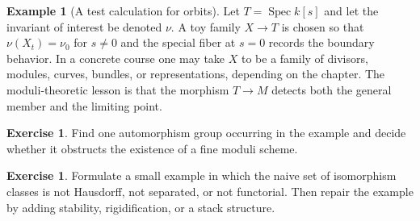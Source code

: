 \documentclass[11pt]{amsart}
\theoremstyle{definition}
\newtheorem{example}[theorem]{Example}
\newtheorem{exercise}[theorem]{Exercise}
\newcommand{\Spec}{\operatorname{Spec}}
\begin{document}
\begin{example}[A test calculation for orbits]
Let $T=\Spec k[s]$ and let the invariant of interest be denoted $\nu$.  A toy family $X\to T$ is chosen so that $\nu(X_t)=\nu_0$ for $s\ne0$ and the special fiber at $s=0$ records the boundary behavior.  In a concrete course one may take $X$ to be a family of divisors, modules, curves, bundles, or representations, depending on the chapter.  The moduli-theoretic lesson is that the morphism $T\to M$ detects both the general member and the limiting point.
\end{example}
\begin{exercise}
Find one automorphism group occurring in the example and decide whether it obstructs the existence of a fine moduli scheme.
\end{exercise}
\begin{exercise}
Formulate a small example in which the naive set of isomorphism classes is not Hausdorff, not separated, or not functorial.  Then repair the example by adding stability, rigidification, or a stack structure.
\end{exercise}
\clearpage
\end{document}
